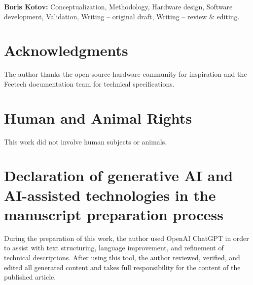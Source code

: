 \documentclass[11pt,letterpaper]{article}
\begin{document}
\textbf{Boris Kotov:} Conceptualization, Methodology, Hardware design, Software development, Validation, Writing -- original draft, Writing -- review \& editing.

\section*{Acknowledgments}

The author thanks the open-source hardware community for inspiration and the Feetech documentation team for technical specifications.

\section*{Human and Animal Rights}

This work did not involve human subjects or animals.

\section*{Declaration of generative AI and AI-assisted technologies 
in the manuscript preparation process}

During the preparation of this work, the author used OpenAI ChatGPT in order to
assist with text structuring, language improvement, and refinement of technical
descriptions. After using this tool, the author reviewed, verified, and edited
all generated content and takes full responsibility for the content of the
published article.



\end{document}
